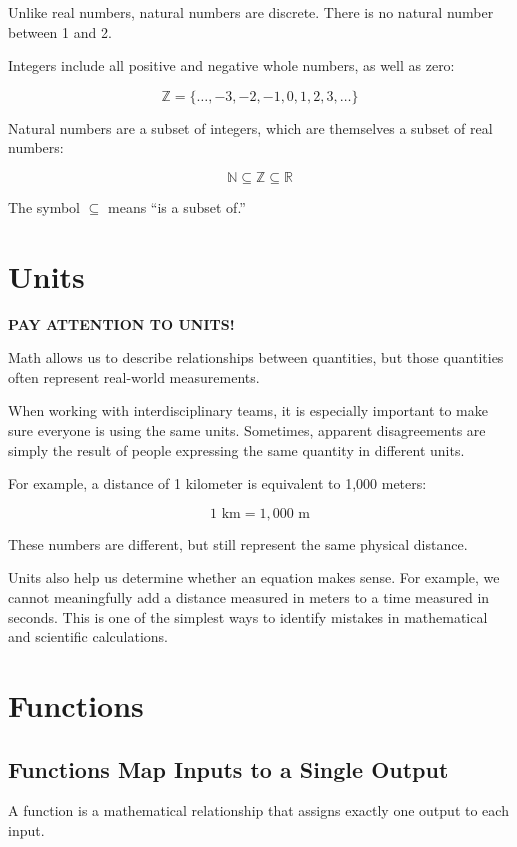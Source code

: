 \documentclass[12pt]{article}
\begin{document}
Unlike real numbers, natural numbers are discrete. There is no natural number between 1 and 2.

Integers include all positive and negative whole numbers, as well as zero:

\[
\mathbb{Z}=\{\ldots,-3,-2,-1,0,1,2,3,\ldots\}
\]

Natural numbers are a subset of integers, which are themselves a subset of real numbers:

\[
\mathbb{N}\subseteq\mathbb{Z}\subseteq\mathbb{R}
\]

The symbol $\subseteq$ means ``is a subset of.''

\section{Units}

\textbf{PAY ATTENTION TO UNITS!}

Math allows us to describe relationships between quantities, but those quantities often represent real-world measurements.

When working with interdisciplinary teams, it is especially important to make sure everyone is using the same units. Sometimes, apparent disagreements are simply the result of people expressing the same quantity in different units.

For example, a distance of 1 kilometer is equivalent to 1,000 meters:

\[
1\text{ km}=1{,}000\text{ m}
\]

These numbers are different, but still represent the same physical distance.

Units also help us determine whether an equation makes sense. For example, we cannot meaningfully add a distance measured in meters to a time measured in seconds. This is one of the simplest ways to identify mistakes in mathematical and scientific calculations.


\section{Functions}

\subsection{Functions Map Inputs to a Single Output}

A function is a mathematical relationship that assigns exactly one output to each input.
\end{document}
